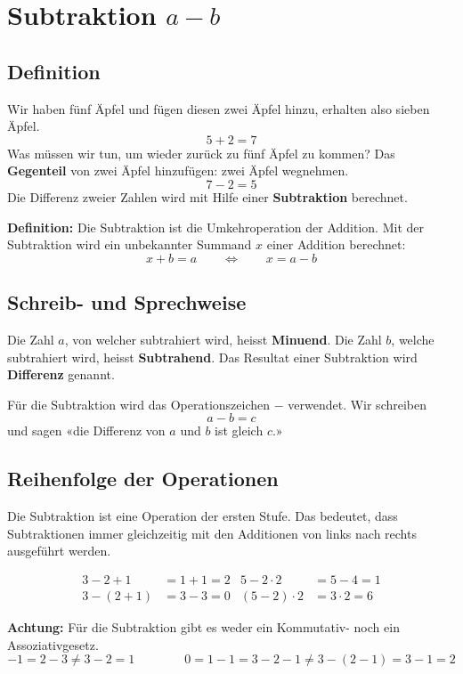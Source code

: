 \newpage
\section{Subtraktion $a-b$}

\subsection{Definition}

Wir haben fünf Äpfel und fügen diesen zwei Äpfel hinzu, erhalten also sieben Äpfel.
\[
  5+2 = 7
\]
Was müssen wir tun, um wieder zurück zu fünf Äpfel zu kommen? Das \textbf{Gegenteil} von zwei Äpfel hinzufügen: zwei Äpfel wegnehmen.
\[
  7-2 = 5
\]
Die Differenz zweier Zahlen wird mit Hilfe einer \textbf{Subtraktion} berechnet.

\textbf{Definition:} Die Subtraktion ist die Umkehroperation der Addition. Mit der Subtraktion wird ein unbekannter Summand $x$ einer Addition berechnet:
\[
  x+b = a \qquad\Leftrightarrow\qquad x = a-b
\]

\subsection{Schreib- und Sprechweise}

Die Zahl $a$, von welcher subtrahiert wird, heisst \textbf{Minuend}. Die Zahl $b$, welche subtrahiert wird, heisst \textbf{Subtrahend}. Das Resultat einer Subtraktion wird \textbf{Differenz} genannt.

Für die Subtraktion wird das Operationszeichen $-$ verwendet. Wir schreiben
\[
  a - b = c
\]
und sagen «die Differenz von $a$ und $b$ ist gleich $c$.»

\subsection{Reihenfolge der Operationen}

Die Subtraktion ist eine Operation der ersten Stufe. Das bedeutet, dass Subtraktionen immer gleichzeitig mit den Additionen von links nach rechts ausgeführt werden.
\begin{example}
  \begin{align*}
      3-2+1 &= 1+1 = 2 &   5-2\cdot 2 &= 5-4 = 1 \\
    3-(2+1) &= 3-3 = 0 & (5-2)\cdot 2 &= 3\cdot 2 = 6
  \end{align*}
\end{example}
\begin{note}
  \textbf{Achtung:} Für die Subtraktion gibt es weder ein Kommutativ- noch ein Assoziativgesetz.
  \[
    -1 = 2-3 \ne 3-2 = 1 \qquad\qquad 0 = 1-1 = 3-2-1 \ne 3-(2-1) = 3-1 = 2
  \]
\end{note}
